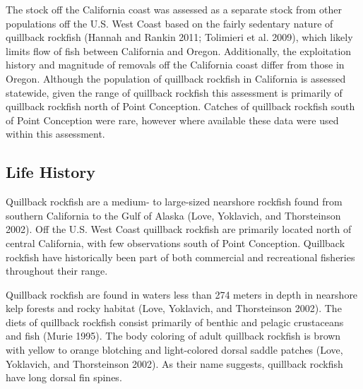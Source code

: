 \documentclass[11pt,
  english,
  a4paper,
]{article}
\begin{document}
\leavevmode\tagmcend\tagstructend\par


The stock off the California coast was assessed as a separate stock from other populations off the U.S. West Coast based on the fairly sedentary nature of quillback rockfish {(Hannah and Rankin 2011; Tolimieri et al. 2009)\leavevmode\tagmcend\tagstructend}, which likely limits flow of fish between California and Oregon. Additionally, the exploitation history and magnitude of removals off the California coast differ from those in Oregon. Although the population of quillback rockfish in California is assessed statewide, given the range of quillback rockfish this assessment is primarily of quillback rockfish north of Point Conception. Catches of quillback rockfish south of Point Conception were rare, however where available these data were used within this assessment.

\leavevmode\tagmcend\tagstructend\par


\hypertarget{life-history}{%
\subsection{Life History}\label{life-history}}

\leavevmode\tagmcend\tagstructend


Quillback rockfish are a medium- to large-sized nearshore rockfish found from southern California to the Gulf of Alaska {(Love, Yoklavich, and Thorsteinson 2002)\leavevmode\tagmcend\tagstructend}. Off the U.S. West Coast quillback rockfish are primarily located north of central California, with few observations south of Point Conception. Quillback rockfish have historically been part of both commercial and recreational fisheries throughout their range.

\leavevmode\tagmcend\tagstructend\par


Quillback rockfish are found in waters less than 274 meters in depth in nearshore kelp forests and rocky habitat {(Love, Yoklavich, and Thorsteinson 2002)\leavevmode\tagmcend\tagstructend}. The diets of quillback rockfish consist primarily of benthic and pelagic crustaceans and fish {(Murie 1995)\leavevmode\tagmcend\tagstructend}. The body coloring of adult quillback rockfish is brown with yellow to orange blotching and light-colored dorsal saddle patches {(Love, Yoklavich, and Thorsteinson 2002)\leavevmode\tagmcend\tagstructend}. As their name suggests, quillback rockfish have long dorsal fin spines.
\end{document}

